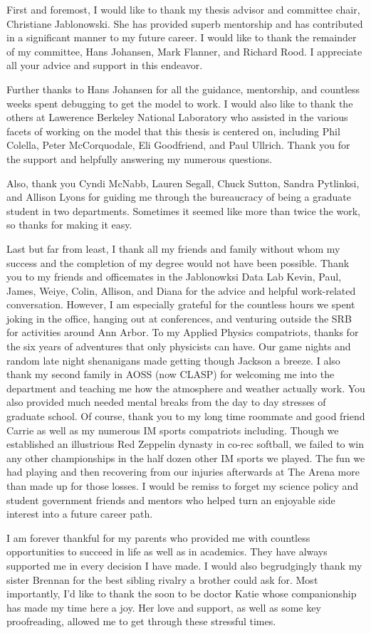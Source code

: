 First and foremost, I would like to thank my thesis advisor and committee chair, 
Christiane Jablonowski. She has provided superb mentorship and 
has contributed in a significant manner to my future career.
I would like to thank the remainder of my committee, Hans Johansen,
Mark Flanner, and Richard Rood.
I appreciate all your advice and support in this endeavor.

Further thanks to Hans Johansen for all the guidance, mentorship, 
and countless weeks spent debugging 
to get the model to work. I would also like to thank the others
at Lawerence Berkeley National Laboratory who assisted in the various facets 
of working on the model that this thesis is centered on, including
Phil Colella, Peter McCorquodale, Eli Goodfriend, and Paul Ullrich. 
Thank you for the support and helpfully answering my numerous questions.
 
 Also, thank you Cyndi McNabb, Lauren Segall, 
 Chuck Sutton, Sandra Pytlinksi, and Allison Lyons for 
 guiding me through the bureaucracy of 
 being a graduate student in two departments. Sometimes it seemed 
 like more than twice the work, so thanks for making it easy.
 
Last but far from least, I thank all my friends and family without whom 
my success and the completion of my degree would not have been possible.
Thank you to my friends and officemates in the Jablonowksi Data Lab Kevin, Paul, James, 
Weiye, Colin, Allison, and Diana for the advice and  
helpful work-related conversation. However,
I am especially grateful for the countless
hours we spent joking in the office, hanging out at conferences, and 
venturing outside the SRB for activities around Ann Arbor.
To my Applied Physics compatriots, 
thanks for the six years of adventures that only physicists can have.
Our game nights 
and random late night shenanigans made getting though Jackson a breeze.
I also thank my second family in AOSS (now CLASP) for welcoming me 
into the department and teaching me how the atmosphere and weather actually work.
You also provided much needed mental breaks from the day to day stresses of graduate school.
Of course, thank you to my long time roommate and good friend Carrie
as well as my numerous IM sports compatriots including. 
Though we established an illustrious Red Zeppelin dynasty 
in co-rec softball, we failed to win any other championships 
in the half dozen other IM sports we played.  
The fun we had playing and then recovering 
from our injuries afterwards at The Arena more than made up for those losses.
I would be remiss to forget my science policy and student government friends and mentors 
who helped turn an enjoyable side interest into a future career path.
 
 I am forever thankful for my parents who provided me with 
 countless opportunities to succeed in life as well as in academics. 
 They have always supported me in every decision I have made. 
 I would also begrudgingly thank my sister Brennan for the best 
 sibling rivalry a brother could ask for. Most importantly, I'd like to 
 thank the soon to be doctor Katie whose companionship 
 has made my time here a joy. 
 Her love and support, as well as some key proofreading,
 allowed me to get through these stressful times.